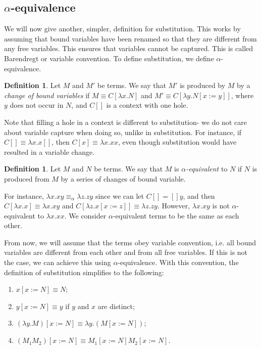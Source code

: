 \documentclass[a4paper, openany]{memoir}
\theoremstyle{definition}
\newtheorem{definition}[proposition]{Definition}
\begin{document}
    \subsection{$\alpha$-equivalence}
    We will now give another, simpler, definition for substitution. This works by assuming that bound variables have been renamed so that they are different from any free variables. This ensures that variables cannot be captured. This is called Barendregt or variable convention. To define substitution, we define $\alpha$-equivalence.
    \begin{definition}
        Let $M$ and $M'$ be terms. We say that $M'$ is produced by $M$ by a \emph{change of bound variables} if $M \equiv C[\lambda x.N]$ and $M' \equiv C[\lambda y.N[x := y]]$, where $y$ does not occur in $N$, and $C[]$ is a context with one hole.
    \end{definition}
    \noindent Note that filling a hole in a context is different to substitution- we do not care about variable capture when doing so, unlike in substitution. For instance, if $C[] \equiv \lambda x.x[]$, then $C[x] \equiv \lambda x.xx$, even though substitution would have resulted in a variable change.
    \begin{definition}
        Let $M$ and $N$ be terms. We say that $M$ is \emph{$\alpha$-equivalent} to $N$ if $N$ is produced from $M$ by a series of changes of bound variable.
    \end{definition}
    \noindent For instance, $\lambda x.xy \equiv_\alpha \lambda z.zy$ since we can let $C[] = []y$, and then $C[\lambda x.x] \equiv \lambda x.xy$ and $C[\lambda z.x[x := z]] \equiv \lambda z.zy$. However, $\lambda x.xy$ is not $\alpha$-equivalent to $\lambda x.xx$. We consider $\alpha$-equivalent terms to be the same as each other.

    From now, we will assume that the terms obey variable convention, i.e. all bound variables are different from each other and from all free variables. If this is not the case, we can achieve this using $\alpha$-equivalence. With this convention, the definition of substitution simplifies to the following:
    \begin{enumerate}
        \item $x[x := N] \equiv N$;
        \item $y[x := N] \equiv y$ if $y$ and $x$ are distinct;
        \item $(\lambda y.M)[x := N] \equiv \lambda y.(M[x := N])$;
        \item $(M_1 M_2)[x := N] \equiv M_1[x := N] M_2[x := N]$.
    \end{enumerate}
\end{document}
